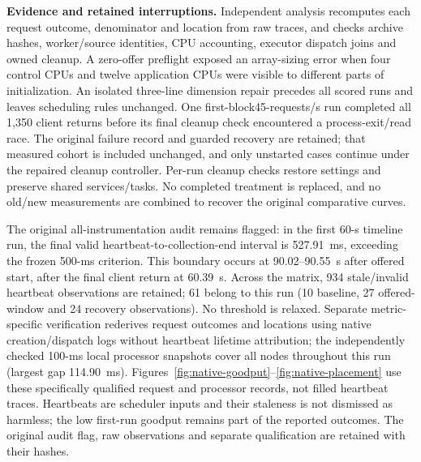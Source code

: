 \noindent\textbf{Evidence and retained interruptions.}
Independent analysis recomputes each request outcome, denominator and location from raw traces, and checks archive hashes, worker/source identities, CPU accounting, executor dispatch joins and owned cleanup. A zero-offer preflight exposed an array-sizing error when four control CPUs and twelve application CPUs were visible to different parts of initialization. An isolated three-line dimension repair precedes all scored runs and leaves scheduling rules unchanged. One first-block45-requests/s run completed all 1,350 client returns before its final cleanup check encountered a process-exit/read race. The original failure record and guarded recovery are retained; that measured cohort is included unchanged, and only unstarted cases continue under the repaired cleanup controller. Per-run cleanup checks restore settings and preserve shared services/tasks. No completed treatment is replaced, and no old/new measurements are combined to recover the original comparative curves.

The original all-instrumentation audit remains flagged: in the first 60-s timeline run, the final valid heartbeat-to-collection-end interval is 527.91~ms, exceeding the frozen 500-ms criterion. This boundary occurs at 90.02--90.55~s after offered start, after the final client return at 60.39~s. Across the matrix, 934 stale/invalid heartbeat observations are retained; 61 belong to this run (10 baseline, 27 offered-window and 24 recovery observations). No threshold is relaxed. Separate metric-specific verification rederives request outcomes and locations using native creation/dispatch logs without heartbeat lifetime attribution; the independently checked 100-ms local processor snapshots cover all nodes throughout this run (largest gap 114.90~ms). Figures~\ref{fig:native-goodput}--\ref{fig:native-placement} use these specifically qualified request and processor records, not filled heartbeat traces. Heartbeats are scheduler inputs and their staleness is not dismissed as harmless; the low first-run goodput remains part of the reported outcomes. The original audit flag, raw observations and separate qualification are retained with their hashes.
